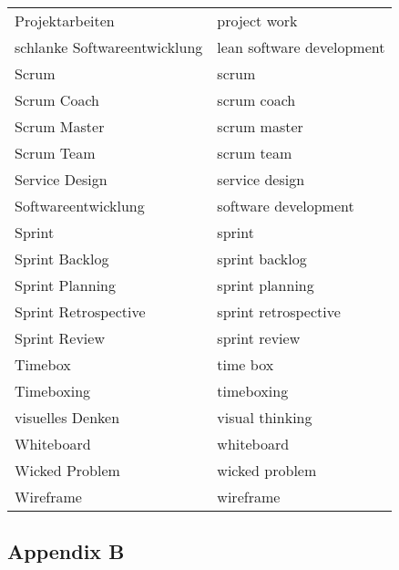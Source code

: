 \begin{spacing}{.5}
\begin{longtable}{ p{} p{}}
    Projektarbeiten & project work \\
    schlanke Softwareentwicklung & lean software development \\
    Scrum & scrum \\
    Scrum Coach & scrum coach \\
    Scrum Master & scrum master \\
    Scrum Team & scrum team \\
    Service Design & service design \\
    Softwareentwicklung & software development \\
    Sprint & sprint \\
    Sprint Backlog & sprint backlog \\
    Sprint Planning & sprint planning \\
    Sprint Retrospective & sprint retrospective \\
    Sprint Review & sprint review \\
    Timebox & time box \\
    Timeboxing & timeboxing \\
    visuelles Denken & visual thinking \\
    Whiteboard & whiteboard \\
    Wicked Problem & wicked problem \\
    Wireframe & wireframe \\
\end{longtable}
\endgroup
\end{spacing}

\newpage
\begin{center}
\subsection*{\hfill Appendix B \hfill}\label{Appendix B}
\end{center}

